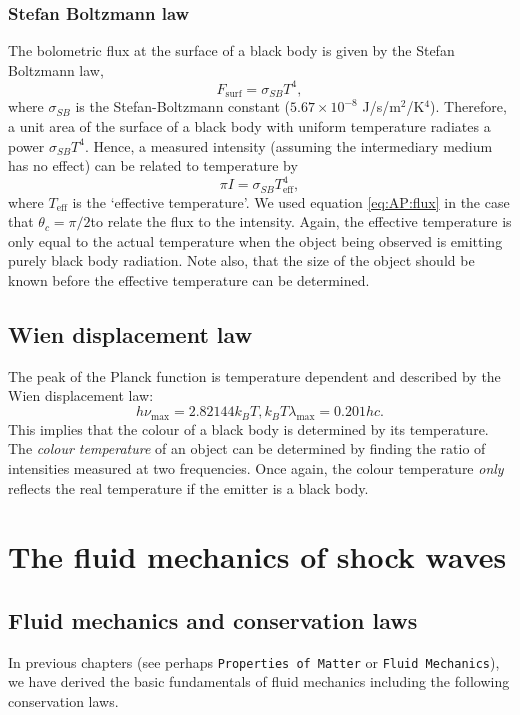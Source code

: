 \subsubsection{Stefan Boltzmann law}
The bolometric flux at the surface of a black body is given by the Stefan Boltzmann law,
%
\begin{equation}
	F_\text{surf} = \sigma_{SB} T^4,
	\label{eq:AP:stefan_boltzmann_law}
\end{equation}
%
where \(\sigma_{SB}\) is the Stefan-Boltzmann constant (\(5.67 \times 10^{-8}\) J/s/m\(^2\)/K\(^4\)).
 Therefore, a unit area of the surface of a black body with uniform temperature radiates a power \(\sigma_{SB} T^4\).
 Hence, a measured intensity (assuming the intermediary medium has no effect) can be related to temperature by
%
\begin{equation}
	\pi I = \sigma_{SB} T^4_{\text{eff}},
	\label{eq:AP:effective_temperature}
\end{equation}
%
where \(T_{\text{eff}}\) is the `effective temperature'. We used equation \ref{eq:AP:flux} in the case that \(\theta_c = \pi / 2 \)to relate the flux to the intensity.
 Again, the effective temperature is only equal to the actual temperature when the object being observed is emitting purely black body radiation.
 Note also, that the size of the object should be known before the effective temperature can be determined.
%
%
\subsection{Wien displacement law}
The peak of the Planck function is temperature dependent and described by the Wien displacement law:
%
\begin{equation}
	h \nu_\text{max} = 2.82144 k_B T,
	k_B T \lambda_\text{max} = 0.201 h c.
	\label{eq:AP:wien_displacement}
\end{equation}
%
This implies that the colour of a black body is determined by its temperature. The \emph{colour temperature} of an object can be determined by finding the ratio of intensities measured at two frequencies. Once again, the colour temperature \emph{only} reflects the real temperature if the emitter is a black body.
%
%
%
\section{The fluid mechanics of shock waves}
\subsection{Fluid mechanics and conservation laws}
In previous chapters (see perhaps \texttt{Properties of Matter} or \texttt{Fluid Mechanics}), we have derived the basic fundamentals of fluid mechanics including the following conservation laws.
%
